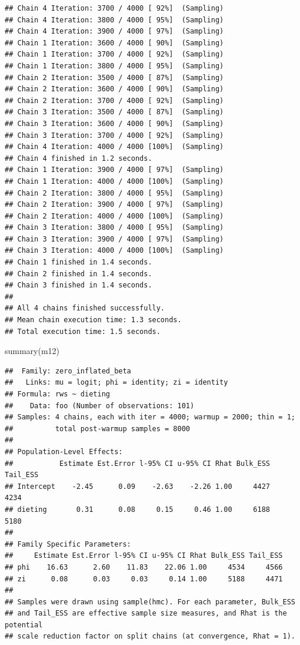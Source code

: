 \documentclass[
]{article}
\newenvironment{Shaded}{\begin{snugshade}}{\end{snugshade}}
\newcommand{\FunctionTok}[1]{\textcolor[rgb]{0.00,0.00,0.00}{#1}}
\newcommand{\NormalTok}[1]{#1}
\begin{document}
\begin{verbatim}
## Chain 4 Iteration: 3700 / 4000 [ 92%]  (Sampling) 
## Chain 4 Iteration: 3800 / 4000 [ 95%]  (Sampling) 
## Chain 4 Iteration: 3900 / 4000 [ 97%]  (Sampling) 
## Chain 1 Iteration: 3600 / 4000 [ 90%]  (Sampling) 
## Chain 1 Iteration: 3700 / 4000 [ 92%]  (Sampling) 
## Chain 1 Iteration: 3800 / 4000 [ 95%]  (Sampling) 
## Chain 2 Iteration: 3500 / 4000 [ 87%]  (Sampling) 
## Chain 2 Iteration: 3600 / 4000 [ 90%]  (Sampling) 
## Chain 2 Iteration: 3700 / 4000 [ 92%]  (Sampling) 
## Chain 3 Iteration: 3500 / 4000 [ 87%]  (Sampling) 
## Chain 3 Iteration: 3600 / 4000 [ 90%]  (Sampling) 
## Chain 3 Iteration: 3700 / 4000 [ 92%]  (Sampling) 
## Chain 4 Iteration: 4000 / 4000 [100%]  (Sampling) 
## Chain 4 finished in 1.2 seconds.
## Chain 1 Iteration: 3900 / 4000 [ 97%]  (Sampling) 
## Chain 1 Iteration: 4000 / 4000 [100%]  (Sampling) 
## Chain 2 Iteration: 3800 / 4000 [ 95%]  (Sampling) 
## Chain 2 Iteration: 3900 / 4000 [ 97%]  (Sampling) 
## Chain 2 Iteration: 4000 / 4000 [100%]  (Sampling) 
## Chain 3 Iteration: 3800 / 4000 [ 95%]  (Sampling) 
## Chain 3 Iteration: 3900 / 4000 [ 97%]  (Sampling) 
## Chain 3 Iteration: 4000 / 4000 [100%]  (Sampling) 
## Chain 1 finished in 1.4 seconds.
## Chain 2 finished in 1.4 seconds.
## Chain 3 finished in 1.4 seconds.
## 
## All 4 chains finished successfully.
## Mean chain execution time: 1.3 seconds.
## Total execution time: 1.5 seconds.
\end{verbatim}

\begin{Shaded}
\begin{Highlighting}[]
\FunctionTok{summary}\NormalTok{(m12)}
\end{Highlighting}
\end{Shaded}

\begin{verbatim}
##  Family: zero_inflated_beta 
##   Links: mu = logit; phi = identity; zi = identity 
## Formula: rws ~ dieting 
##    Data: foo (Number of observations: 101) 
## Samples: 4 chains, each with iter = 4000; warmup = 2000; thin = 1;
##          total post-warmup samples = 8000
## 
## Population-Level Effects: 
##           Estimate Est.Error l-95% CI u-95% CI Rhat Bulk_ESS Tail_ESS
## Intercept    -2.45      0.09    -2.63    -2.26 1.00     4427     4234
## dieting       0.31      0.08     0.15     0.46 1.00     6188     5180
## 
## Family Specific Parameters: 
##     Estimate Est.Error l-95% CI u-95% CI Rhat Bulk_ESS Tail_ESS
## phi    16.63      2.60    11.83    22.06 1.00     4534     4566
## zi      0.08      0.03     0.03     0.14 1.00     5188     4471
## 
## Samples were drawn using sample(hmc). For each parameter, Bulk_ESS
## and Tail_ESS are effective sample size measures, and Rhat is the potential
## scale reduction factor on split chains (at convergence, Rhat = 1).
\end{verbatim}
\end{document}
